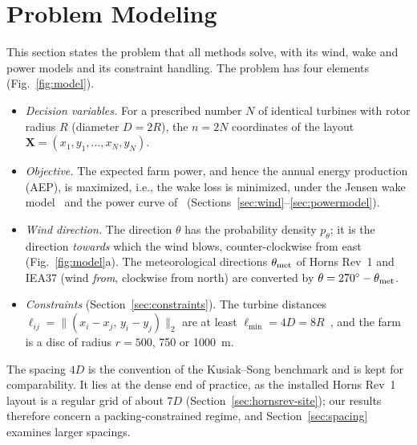 \section{Problem Modeling}
\label{sec:model}

This section states the problem that all methods solve, with its wind, wake and power models and its constraint handling. The problem has four elements (Fig.~\ref{fig:model}).
\begin{itemize}
\item \emph{Decision variables.} For a prescribed number $N$ of identical turbines with rotor radius $R$ (diameter $D=2R$), the $n=2N$ coordinates of the layout $\mathbf X=(x_1,y_1,\ldots,x_N,y_N)$.
\item \emph{Objective.} The expected farm power, and hence the annual energy production (AEP), is maximized, i.e., the wake loss is minimized, under the Jensen wake model~\cite{Jensen1983,Katic1986} and the power curve of~\cite{Kusiak2010} (Sections~\ref{sec:wind}--\ref{sec:powermodel}).
\item \emph{Wind direction.} The direction $\theta$ has the probability density $p_\theta$; it is the direction \emph{towards} which the wind blows, counter-clockwise from east (Fig.~\ref{fig:model}a). The meteorological directions $\theta_{\rm met}$ of Horns Rev~1 and IEA37 (wind \emph{from}, clockwise from north) are converted by $\theta=270^\circ-\theta_{\rm met}$.
\item \emph{Constraints} (Section~\ref{sec:constraints}). The turbine distances $\ell_{ij}=\lVert(x_i-x_j,\,y_i-y_j)\rVert_2$ are at least $\ell_{\min}=4D=8R$~\cite{Kusiak2010,Bansal2017}, and the farm is a disc of radius $r=500$, 750 or 1000~m.
\end{itemize}
The spacing $4D$ is the convention of the Kusiak--Song benchmark and is kept for comparability. It lies at the dense end of practice, as the installed Horns Rev~1 layout is a regular grid of about $7D$ (Section~\ref{sec:hornsrev-site}); our results therefore concern a packing-constrained regime, and Section~\ref{sec:spacing} examines larger spacings.

